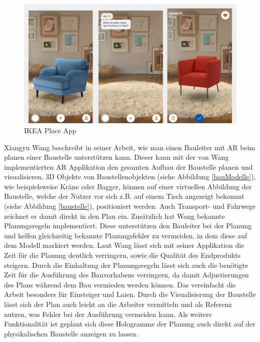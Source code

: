 \begin{figure}[h]
	\begin{center}
		\noindent\includegraphics[scale=0.4]{Resources/Hintergrund/ikea.jpg}
		\caption[IKEA Place App]{IKEA Place App\footnotemark}	
	\end{center}
\end{figure}


Xiangyu Wang \cite{wang_using_2007} beschreibt in seiner Arbeit, wie man einen Bauleiter mit AR beim planen einer Baustelle unterstützen kann. Dieser kann mit der von Wang implementierten AR Applikation den gesamten Aufbau der Baustelle planen und visualisieren. 3D Objekte von Baustellenobjekten (siehe Abbildung \ref{bauModelle}), wie beispielsweise Kräne oder Bagger, können auf einer virtuellen Abbildung der Baustelle, welche der Nutzer vor sich z.B. auf einem Tisch angezeigt bekommt (siehe Abbildung \ref{baustelle}), positioniert werden. Auch Transport- und Fahrwege zeichnet er damit direkt in den Plan ein. Zusätzlich hat Wang bekannte Planungsregeln implementiert. Diese unterstützen den Bauleiter bei der Planung und helfen gleichzeitig bekannte Planungsfehler zu vermeiden, in dem diese auf dem Modell markiert werden. Laut Wang lässt sich mit seiner Applikation die Zeit für die Planung deutlich verringern, sowie die Qualität des Endprodukts steigern. Durch die Einhaltung der Planungsregeln lässt sich auch die benötigte Zeit für die Ausführung des Bauvorhabens verringern, da damit Adjustierungen des Plans während dem Bau vermieden werden können. Das vereinfacht die Arbeit besonders für Einsteiger und Laien. Durch die Visualisierung der Baustelle lässt sich der Plan auch leicht an die Arbeiter vermitteln und als Referenz nutzen, was Fehler bei der Ausführung vermeiden kann. Als weitere Funktionalität ist geplant sich diese Hologramme der Planung auch direkt auf der physikalischen Baustelle anzeigen zu lassen.

